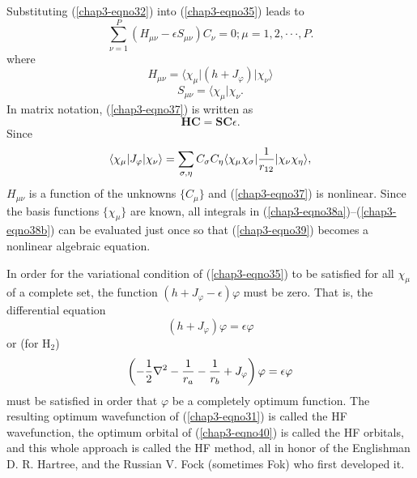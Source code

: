 Substituting (\ref{chap3-eqno32}) into (\ref{chap3-eqno35}) leads to
\begin{equation}
\sum^{P}_{\nu = 1} \left( H_{\mu \nu} - \epsilon S_{\mu \nu} \right) 
C_{\nu} = 0 ; \mu = 1 , 2 , \cdot \cdot \cdot , P.
\label{chap3-eqno37}
\end{equation}
where
\begin{equation}
H_{\mu \nu} = \langle \chi_{\mu} \vert \left( h + J_{\varphi} 
\right) \vert \chi_{\nu} \rangle
\label{chap3-eqno38a}
\end{equation}
\begin{equation}
S_{\mu \nu} = \langle \chi_{\mu} \vert \chi_{\nu}.
\label{chap3-eqno38b}
\end{equation}
In matrix notation, (\ref{chap3-eqno37}) is written as
\begin{equation}
\mathbf{HC} = \mathbf{SC} \epsilon .
\label{chap3-eqno39}
\end{equation}
Since
\begin{equation}
\langle \chi_{\mu} \vert J_{\varphi} \vert \chi_{\nu} \rangle = 
\sum_{\sigma , \eta} C_{\sigma} C_{\eta} \langle \chi_{\mu} 
\chi_{\sigma} \vert {1 \over r_{12}} \vert \chi_{\nu} \chi_{\eta} 
\rangle ,
\end{equation}
$H_{\mu \nu}$ is a function of the unknowns $\{ C_{\mu} \}$ and
(\ref{chap3-eqno37}) is nonlinear. Since the basis functions $\{
\chi_{\mu} \}$ are known, all integrals in
(\ref{chap3-eqno38a})--(\ref{chap3-eqno38b}) can be evaluated just
once so that (\ref{chap3-eqno39}) becomes a nonlinear algebraic
equation.

In order for the variational condition of (\ref{chap3-eqno35}) to be
satisfied for all $\chi_{\mu}$ of a complete set, the function $(h +
J_{\varphi} - \epsilon)\varphi$ must be zero.  That is, the
differential equation
\begin{equation}
( h + J_{\varphi} ) \varphi = \epsilon \varphi
\label{chap3-eqno40}
\end{equation}
or (for H$_2$)
\begin{equation}
\left( - {1 \over 2} \nabla ^2 - {1 \over r_a} - {1 \over r_b} + 
J_{\varphi} \right) \varphi = \epsilon \varphi
\end{equation}
must be satisfied in order that $\varphi$ be a completely optimum function. The
resulting optimum wavefunction of (\ref{chap3-eqno31}) is called the HF 
wavefunction, the optimum orbital of (\ref{chap3-eqno40}) is called the HF
orbitals, and this whole approach is called the HF method, all 
in honor of the Englishman D. R. Hartree, and the Russian V. Fock
(sometimes Fok) who first developed it. 

